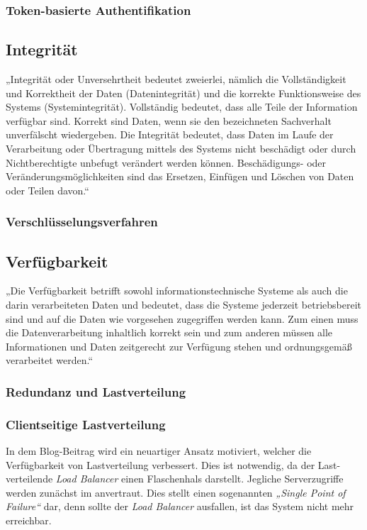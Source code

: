 \subsubsection{Token-basierte Authentifikation}


\subsection{Integrität}
\label{subsec:integrität}
„Integrität oder Unversehrtheit bedeutet zweierlei, nämlich die Vollständigkeit und Korrektheit der Daten (Datenintegrität) und die korrekte Funktionsweise des Systems (Systemintegrität). Vollständig bedeutet, dass alle Teile der Information verfügbar sind. Korrekt sind Daten, wenn sie den bezeichneten Sachverhalt unverfälscht wiedergeben. Die Integrität bedeutet, dass Daten im Laufe der Verarbeitung oder Übertragung mittels des Systems nicht beschädigt oder durch Nichtberechtigte unbefugt verändert werden können. Beschädigungs- oder Veränderungsmöglichkeiten sind das Ersetzen, Einfügen und Löschen von Daten oder Teilen davon.“ \cite{Bedner+10}

\subsubsection{Verschlüsselungsverfahren}


\subsection{Verfügbarkeit}
\label{subsec:verfügbarkeit}
„Die Verfügbarkeit betrifft sowohl informationstechnische Systeme als auch die darin verarbeiteten Daten und bedeutet, dass die Systeme jederzeit betriebsbereit sind und auf die Daten wie vorgesehen zugegriffen werden kann. Zum einen muss die Datenverarbeitung inhaltlich korrekt sein und zum anderen müssen alle Informationen und Daten zeitgerecht zur Verfügung stehen und ordnungsgemäß verarbeitet werden.“ \cite{Bedner+10}

\subsubsection{Redundanz und Lastverteilung}

\subsubsection{Clientseitige Lastverteilung}

In dem Blog-Beitrag \cite{Li15} wird ein neuartiger Ansatz motiviert, welcher die Verfügbarkeit von Lastverteilung verbessert. Dies ist notwendig, da der Last-verteilende \textit{Load Balancer} einen Flaschenhals darstellt. Jegliche Serverzugriffe werden zunächst im anvertraut. Dies stellt einen sogenannten \textit{„Single Point of Failure“} dar, denn sollte der \textit{Load Balancer} ausfallen, ist das System nicht mehr erreichbar.

